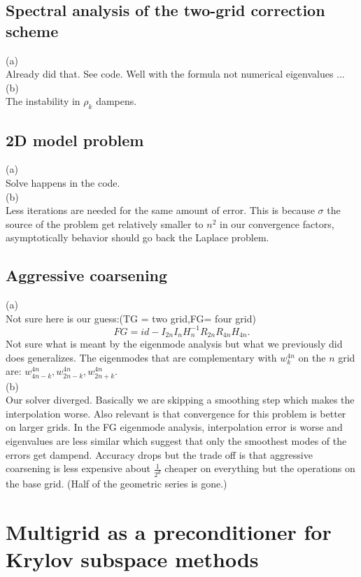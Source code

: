 \documentclass[a4paper,12pt]{article}
\begin{document}
\subsection{Spectral analysis of the two-grid correction scheme}
(a) \\
Already did that. See code. Well with the formula not numerical eigenvalues ... \\
(b) \\
The instability in $\rho_{k}$ dampens.


\subsection{2D model problem}
(a) \\
Solve happens in the code.\\
(b) \\
Less iterations are needed for the same amount of error. This is because
$\sigma$ the source of the problem get relatively smaller to $n^{2}$ in
our convergence factors, asymptotically behavior should go back the
Laplace problem.

\subsection{Aggressive coarsening}
(a)\\
Not sure here is our guess:(TG = two grid,FG= four grid)
\begin{equation}
    FG = id -I_{2n} I_{n} H_{n}^{-1} R_{2n} R_{4n} H_{4n}.
\end{equation}
Not sure what is meant by the eigenmode analysis but what we previously
did does generalizes. The eigenmodes that are complementary with $w_{k}^{4n}$ on
the $n$ grid are: $w_{4n-k}^{4n},w_{2n-k}^{4n},w_{2n+k}^{4n}$. \\
(b)\\
Our solver diverged. Basically we are skipping a smoothing step which
makes the interpolation worse. Also relevant is that convergence
for this problem is better on larger grids. In the FG eigenmode analysis, interpolation error is worse
and eigenvalues are less similar which suggest that only the smoothest modes of the errors get dampend.
Accuracy drops but the trade off is that aggressive coarsening is less expensive about $\frac{1}{2^{d}}$
cheaper on everything but the operations on the base grid. (Half of the geometric series is gone.)

\section{Multigrid as a preconditioner for Krylov subspace methods}
\end{document}
